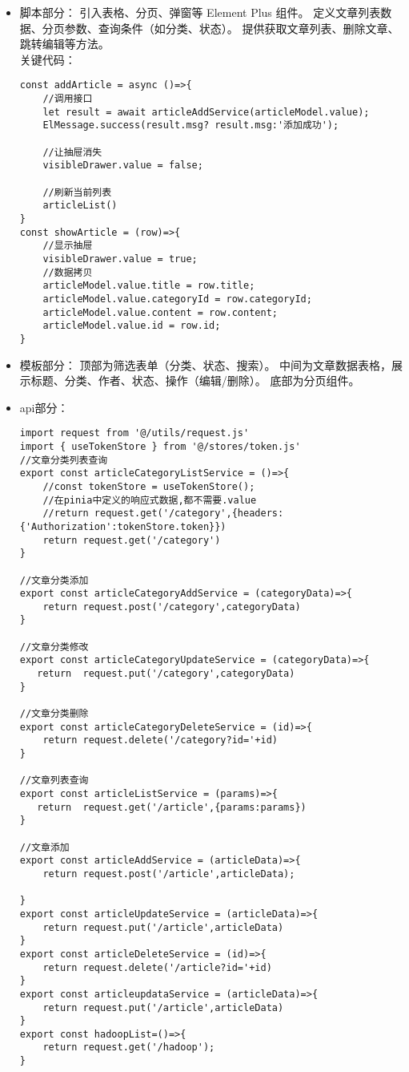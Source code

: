 \documentclass[bachelor]{thesis-uestc}
\begin{document}
\begin{itemize}
\item 脚本部分：
引入表格、分页、弹窗等 Element Plus 组件。
定义文章列表数据、分页参数、查询条件（如分类、状态）。
提供获取文章列表、删除文章、跳转编辑等方法。
\\关键代码：
\begin{lstlisting}
const addArticle = async ()=>{
    //调用接口
    let result = await articleAddService(articleModel.value);
    ElMessage.success(result.msg? result.msg:'添加成功');

    //让抽屉消失
    visibleDrawer.value = false;

    //刷新当前列表
    articleList()
}
const showArticle = (row)=>{
    //显示抽屉
    visibleDrawer.value = true;
    //数据拷贝
    articleModel.value.title = row.title;
    articleModel.value.categoryId = row.categoryId;
    articleModel.value.content = row.content;
    articleModel.value.id = row.id;
}
\end{lstlisting}

\item 模板部分：
顶部为筛选表单（分类、状态、搜索）。
中间为文章数据表格，展示标题、分类、作者、状态、操作（编辑/删除）。
底部为分页组件。

\item api部分：
\begin{lstlisting}
import request from '@/utils/request.js'
import { useTokenStore } from '@/stores/token.js'
//文章分类列表查询
export const articleCategoryListService = ()=>{
    //const tokenStore = useTokenStore();
    //在pinia中定义的响应式数据,都不需要.value
    //return request.get('/category',{headers:{'Authorization':tokenStore.token}})
    return request.get('/category')
}

//文章分类添加
export const articleCategoryAddService = (categoryData)=>{
    return request.post('/category',categoryData)
}

//文章分类修改
export const articleCategoryUpdateService = (categoryData)=>{
   return  request.put('/category',categoryData)
}

//文章分类删除
export const articleCategoryDeleteService = (id)=>{
    return request.delete('/category?id='+id)
}

//文章列表查询
export const articleListService = (params)=>{
   return  request.get('/article',{params:params})
}

//文章添加
export const articleAddService = (articleData)=>{
    return request.post('/article',articleData);

}
export const articleUpdateService = (articleData)=>{
    return request.put('/article',articleData)
}
export const articleDeleteService = (id)=>{
    return request.delete('/article?id='+id)
}
export const articleupdataService = (articleData)=>{
    return request.put('/article',articleData)
}
export const hadoopList=()=>{
    return request.get('/hadoop');
}
\end{lstlisting}
\end{itemize}
\end{document}
